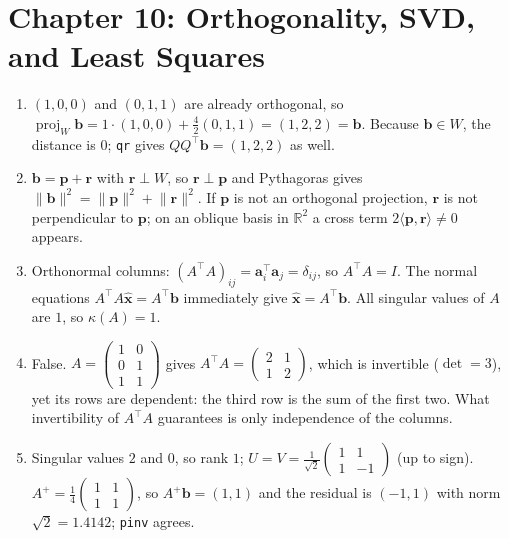 \section*{Chapter 10: Orthogonality, SVD, and Least Squares}
\begin{enumerate}[label=\textbf{10.\arabic*}]
  \item $(1,0,0)$ and $(0,1,1)$ are already orthogonal, so
        $\operatorname{proj}_{W}\mathbf{b}=1\cdot(1,0,0)+\frac{4}{2}(0,1,1)
        =(1,2,2)=\mathbf{b}$. Because $\mathbf{b}\in W$, the distance is $0$;
        \texttt{qr} gives $QQ^{\top}\mathbf{b}=(1,2,2)$ as well.

  \item $\mathbf{b}=\mathbf{p}+\mathbf{r}$ with $\mathbf{r}\perp W$, so
        $\mathbf{r}\perp\mathbf{p}$ and Pythagoras gives
        $\lVert\mathbf{b}\rVert^{2}=\lVert\mathbf{p}\rVert^{2}
        +\lVert\mathbf{r}\rVert^{2}$. If $\mathbf{p}$ is not an orthogonal
        projection, $\mathbf{r}$ is not perpendicular to $\mathbf{p}$; on an oblique
        basis in $\mathbb{R}^{2}$ a cross term $2\langle\mathbf{p},\mathbf{r}
        \rangle\ne0$ appears.

  \item Orthonormal columns: $(A^{\top}A)_{ij}=\mathbf{a}_{i}^{\top}\mathbf{a}_{j}
        =\delta_{ij}$, so $A^{\top}A=I$. The normal equations
        $A^{\top}A\hat{\mathbf{x}}=A^{\top}\mathbf{b}$ immediately give
        $\hat{\mathbf{x}}=A^{\top}\mathbf{b}$. All singular values of $A$ are
        $1$, so $\kappa(A)=1$.

  \item False. $A=\begin{pmatrix}1&0\\0&1\\1&1\end{pmatrix}$ gives
        $A^{\top}A=\begin{pmatrix}2&1\\1&2\end{pmatrix}$, which is invertible
        ($\det=3$), yet its rows are dependent: the third row is the sum of the first
        two. What invertibility of $A^{\top}A$ guarantees is only independence of the
        columns.

  \item Singular values $2$ and $0$, so rank $1$;
        $U=V=\frac{1}{\sqrt2}\begin{pmatrix}1&1\\1&-1\end{pmatrix}$ (up to
        sign). $A^{+}=\frac14\begin{pmatrix}1&1\\1&1\end{pmatrix}$, so
        $A^{+}\mathbf{b}=(1,1)$ and the residual is $(-1,1)$ with norm
        $\sqrt2=1.4142$; \texttt{pinv} agrees.


\end{enumerate}
